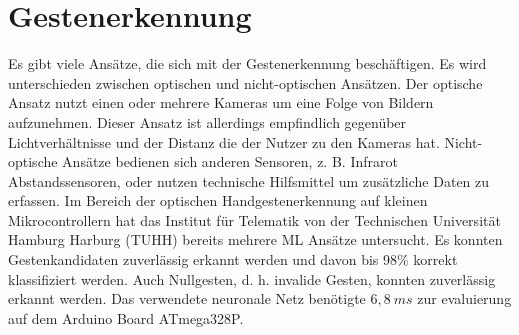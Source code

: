 \chapter{Gestenerkennung}
Es gibt viele Ansätze, die sich mit der Gestenerkennung beschäftigen. Es wird unterschieden zwischen optischen und nicht-optischen Ansätzen. Der optische Ansatz nutzt einen
oder mehrere Kameras um eine Folge von Bildern aufzunehmen. Dieser Ansatz ist allerdings empfindlich gegenüber Lichtverhältnisse und der Distanz die der
Nutzer zu den Kameras hat. Nicht-optische Ansätze bedienen sich anderen Sensoren, z. B. Infrarot Abstandssensoren, oder nutzen technische Hilfsmittel um zusätzliche Daten zu erfassen.
\newline
\newline
Im Bereich der optischen Handgestenerkennung auf kleinen Mikrocontrollern hat das Institut für Telematik von der Technischen Universität Hamburg Harburg (TUHH) bereits mehrere ML Ansätze untersucht.
Es konnten Gestenkandidaten zuverlässig erkannt werden und davon bis 98\% korrekt klassifiziert werden. Auch Nullgesten, d. h. invalide Gesten, konnten zuverlässig erkannt werden. Das verwendete neuronale Netz
benötigte $6,8\ ms$ zur evaluierung auf dem Arduino Board ATmega328P.


